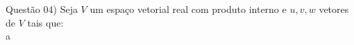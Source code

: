 
\noindent \textcolor{COLOR1}{Questão 04)} Seja $V$ um espaço vetorial real com produto interno e $u, v, w$ vetores de $V$ tais que:
\\
a
\\